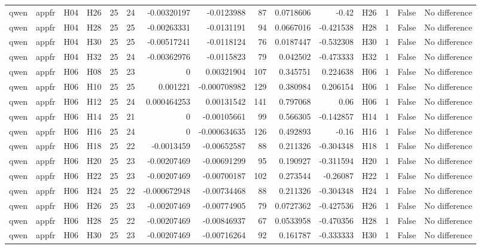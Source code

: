 \begin{longtable}{llllrrrrrrrlrrl}
qwen & appfr & H04 & H26 & 25 & 24 & -0.00320197 & -0.0123988 & 87 & 0.0718606 & -0.42 & H26 & 1 & False & No difference \\
qwen & appfr & H04 & H28 & 25 & 25 & -0.00263331 & -0.0131191 & 94 & 0.0667016 & -0.421538 & H28 & 1 & False & No difference \\
qwen & appfr & H04 & H30 & 25 & 25 & -0.00517241 & -0.0118124 & 76 & 0.0187447 & -0.532308 & H30 & 1 & False & No difference \\
qwen & appfr & H04 & H32 & 25 & 24 & -0.00362976 & -0.0115823 & 79 & 0.042502 & -0.473333 & H32 & 1 & False & No difference \\
qwen & appfr & H06 & H08 & 25 & 23 & 0 & 0.00321904 & 107 & 0.345751 & 0.224638 & H06 & 1 & False & No difference \\
qwen & appfr & H06 & H10 & 25 & 25 & 0.001221 & -0.000708982 & 129 & 0.380984 & 0.206154 & H06 & 1 & False & No difference \\
qwen & appfr & H06 & H12 & 25 & 24 & 0.000464253 & 0.00131542 & 141 & 0.797068 & 0.06 & H06 & 1 & False & No difference \\
qwen & appfr & H06 & H14 & 25 & 21 & 0 & -0.00105661 & 99 & 0.566305 & -0.142857 & H14 & 1 & False & No difference \\
qwen & appfr & H06 & H16 & 25 & 24 & 0 & -0.000634635 & 126 & 0.492893 & -0.16 & H16 & 1 & False & No difference \\
qwen & appfr & H06 & H18 & 25 & 22 & -0.0013459 & -0.00652587 & 88 & 0.211326 & -0.304348 & H18 & 1 & False & No difference \\
qwen & appfr & H06 & H20 & 25 & 23 & -0.00207469 & -0.00691299 & 95 & 0.190927 & -0.311594 & H20 & 1 & False & No difference \\
qwen & appfr & H06 & H22 & 25 & 23 & -0.00207469 & -0.00700187 & 102 & 0.273544 & -0.26087 & H22 & 1 & False & No difference \\
qwen & appfr & H06 & H24 & 25 & 22 & -0.000672948 & -0.00734468 & 88 & 0.211326 & -0.304348 & H24 & 1 & False & No difference \\
qwen & appfr & H06 & H26 & 25 & 23 & -0.00207469 & -0.00774905 & 79 & 0.0727362 & -0.427536 & H26 & 1 & False & No difference \\
qwen & appfr & H06 & H28 & 25 & 22 & -0.00207469 & -0.00846937 & 67 & 0.0533958 & -0.470356 & H28 & 1 & False & No difference \\
qwen & appfr & H06 & H30 & 25 & 23 & -0.00207469 & -0.00716264 & 92 & 0.161787 & -0.333333 & H30 & 1 & False & No difference \\

\end{longtable}

